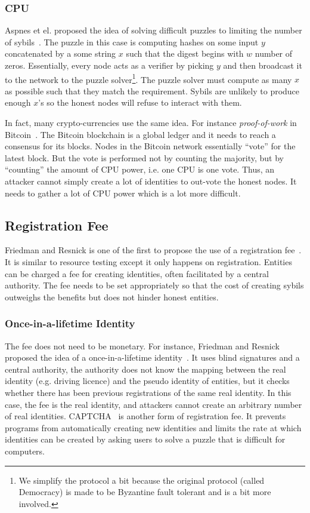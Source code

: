 \subsubsection{CPU}
Aspnes et el. proposed the idea of solving difficult puzzles to limiting the
number of sybils~\cite{aspnes2005exposing}. The puzzle in this case is computing
hashes on some input $y$ concatenated by a some string $x$ such that the digest
begins with $w$ number of zeros. Essentially, every node acts as a verifier by
picking $y$ and then broadcast it to the network to the puzzle
solver\footnote{We simplify the protocol a bit because the original protocol
  (called Democracy) is made to be Byzantine fault tolerant and is a bit more
  involved.}. The puzzle solver must compute as many $x$ as possible such that
they match the requirement. Sybils are unlikely to produce enough $x$'s so the
honest nodes will refuse to interact with them.

In fact, many crypto-currencies use the same idea. For instance
\emph{proof-of-work} in Bitcoin~\cite{nakamoto2008bitcoin}. The Bitcoin
blockchain is a global ledger and it needs to reach a consensus for its blocks.
Nodes in the Bitcoin network essentially ``vote'' for the latest block. But the
vote is performed not by counting the majority, but by ``counting'' the amount
of CPU power, i.e. one CPU is one vote. Thus, an attacker cannot simply create a
lot of identities to out-vote the honest nodes. It needs to gather a lot of CPU
power which is a lot more difficult.


\subsection{Registration Fee}\label{sec:registration-fee}

Friedman and Resnick is one of the first to propose the use of a registration
fee~\cite{resnick2001social}. It is similar to resource testing except it only
happens on registration. Entities can be charged a fee for creating identities,
often facilitated by a central authority. The fee needs to be set appropriately
so that the cost of creating sybils outweighs the benefits but does not hinder
honest entities.

\subsubsection{Once-in-a-lifetime Identity}
The fee does not need to be monetary. For instance, Friedman and Resnick
proposed the idea of a once-in-a-lifetime identity~\cite{resnick2001social}. It
uses blind signatures and a central authority, the authority does not know the
mapping between the real identity (e.g. driving licence) and the pseudo identity
of entities, but it checks whether there has been previous registrations of the
same real identity. In this case, the fee is the real identity, and attackers
cannot create an arbitrary number of real identities.
CAPTCHA~\cite{von2003captcha} is another form of registration fee. It prevents
programs from automatically creating new identities and limits the rate at which
identities can be created by asking users to solve a puzzle that is difficult
for computers.

